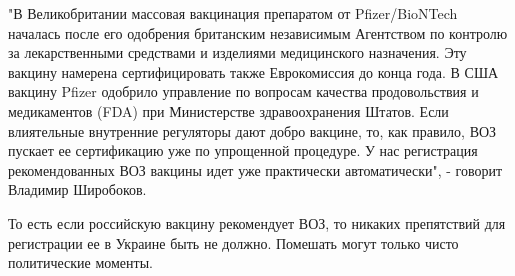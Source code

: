 "В Великобритании массовая вакцинация препаратом от Pfizer/BioNTech началась
после его одобрения британским независимым Агентством по контролю за
лекарственными средствами и изделиями медицинского назначения. Эту вакцину
намерена сертифицировать также Еврокомиссия до конца года. В США вакцину Pfizer
одобрило управление по вопросам качества продовольствия и медикаментов (FDA)
при Министерстве здравоохранения Штатов. Если влиятельные внутренние регуляторы
дают добро вакцине, то, как правило, ВОЗ пускает ее сертификацию уже по
упрощенной процедуре. У нас регистрация рекомендованных ВОЗ вакцины идет уже
практически автоматически", - говорит Владимир Широбоков.

То есть если российскую вакцину рекомендует ВОЗ, то никаких препятствий для
регистрации ее в Украине быть не должно. Помешать могут только чисто
политические моменты.

